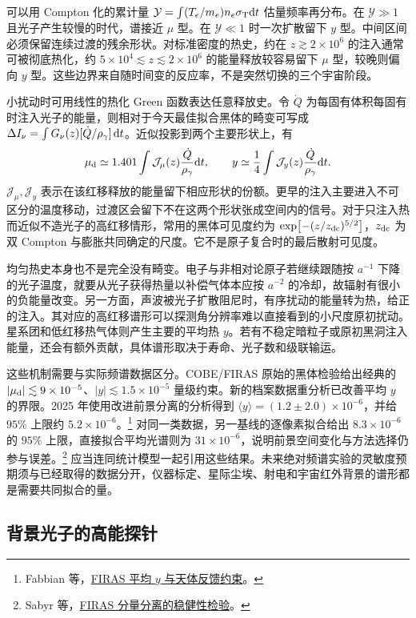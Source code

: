 可以用 Compton 化的累计量 $\mathcal Y=\int (T_e/m_e)n_e\sigma_{\rm T}\dd t$ 估量频率再分布。在 $\mathcal Y\gg1$ 且光子产生较慢的时代，谱接近 $\mu$ 型。在 $\mathcal Y\ll1$ 时一次扩散留下 $y$ 型。中间区间必须保留连续过渡的残余形状。对标准密度的热史，约在 $z\gtrsim2\times10^6$ 的注入通常可被彻底热化，约 $5\times10^4\lesssim z\lesssim2\times10^6$ 的能量释放较容易留下 $\mu$ 型，较晚则偏向 $y$ 型。这些边界来自随时间变的反应率，不是突然切换的三个宇宙阶段。

小扰动时可用线性的热化 Green 函数表达任意释放史。令 $\dot Q$ 为每固有体积每固有时注入光子的能量，则相对于今天最佳拟合黑体的畸变可写成 $\Delta I_\nu=\int G_\nu(z)[\dot Q/\rho_\gamma]\,\dd t$。近似投影到两个主要形状上，有
\[
 \mu_{\rm d}\simeq1.401\int \mathcal J_\mu(z)\frac{\dot Q}{\rho_\gamma}\dd t,
 \qquad
 y\simeq\frac14\int \mathcal J_y(z)\frac{\dot Q}{\rho_\gamma}\dd t .
\]
$\mathcal J_\mu,\mathcal J_y$ 表示在该红移释放的能量留下相应形状的份额。更早的注入主要进入不可区分的温度移动，过渡区会留下不在这两个形状张成空间内的信号。对于只注入热而近似不造光子的高红移情形，常用的黑体可见度约为 $\exp[-(z/z_{\rm dc})^{5/2}]$，$z_{\rm dc}$ 为双 Compton 与膨胀共同确定的尺度。它不是原子复合时的最后散射可见度。

均匀热史本身也不是完全没有畸变。电子与非相对论原子若继续跟随按 $a^{-1}$ 下降的光子温度，就要从光子获得热量以补偿气体本应按 $a^{-2}$ 的冷却，故辐射有很小的负能量改变。另一方面，声波被光子扩散阻尼时，有序扰动的能量转为热，给正的注入。其对应的高红移谱形可以探测角分辨率难以直接看到的小尺度原初扰动。星系团和低红移热气体则产生主要的平均热 $y$。若有不稳定暗粒子或原初黑洞注入能量，还会有额外贡献，具体谱形取决于寿命、光子数和级联输运。

这些机制需要与实际频谱数据区分。COBE/FIRAS 原始的黑体检验给出经典的 $|\mu_{\rm d}|\lesssim9\times10^{-5}$、$|y|\lesssim1.5\times10^{-5}$ 量级约束。新的档案数据重分析已改善平均 $y$ 的界限。2025 年使用改进前景分离的分析得到 $\langle y\rangle=(1.2\pm2.0)\times10^{-6}$，并给 $95\%$ 上限约 $5.2\times10^{-6}$。\footnote{Fabbian 等，\href{https://arxiv.org/abs/2512.03038}{FIRAS 平均 $y$ 与天体反馈约束}。} 对同一类数据，另一基线的逐像素拟合给出 $8.3\times10^{-6}$ 的 $95\%$ 上限，直接拟合平均光谱则为 $31\times10^{-6}$，说明前景空间变化与方法选择仍参与误差。\footnote{Sabyr 等，\href{https://arxiv.org/abs/2508.04593}{FIRAS 分量分离的稳健性检验}。} 应当连同统计模型一起引用这些结果。未来绝对频谱实验的灵敏度预期须与已经取得的数据分开，仪器标定、星际尘埃、射电和宇宙红外背景的谱形都是需要共同拟合的量。

\subsection{背景光子的高能探针}

